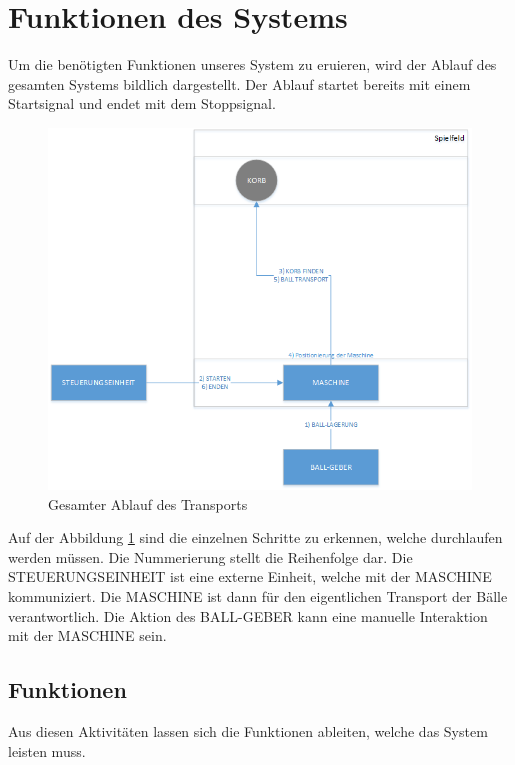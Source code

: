 \section{Funktionen des Systems}
Um die benötigten Funktionen unseres System zu eruieren, wird der Ablauf des gesamten Systems bildlich dargestellt. Der Ablauf startet bereits mit einem Startsignal und endet mit dem Stoppsignal.

\begin{figure}[h!]
\centering
\includegraphics[width=0.7\linewidth]{../../fig/ablauf-transport}
\caption[Gesamter Ablauf des Transports]{Gesamter Ablauf des Transports}
\label{fig:ablauf-transport}
\end{figure}

Auf der Abbildung \ref{fig:ablauf-transport} sind die einzelnen Schritte zu erkennen, welche durchlaufen werden müssen. Die Nummerierung stellt die Reihenfolge dar. Die STEUERUNGSEINHEIT ist eine externe Einheit, welche mit der MASCHINE kommuniziert. Die MASCHINE ist dann für den eigentlichen Transport der Bälle verantwortlich. Die Aktion des BALL-GEBER kann eine manuelle Interaktion mit der MASCHINE sein.\\ 

\subsection{Funktionen}
Aus diesen Aktivitäten lassen sich die Funktionen ableiten, welche das System leisten muss.\\
 
